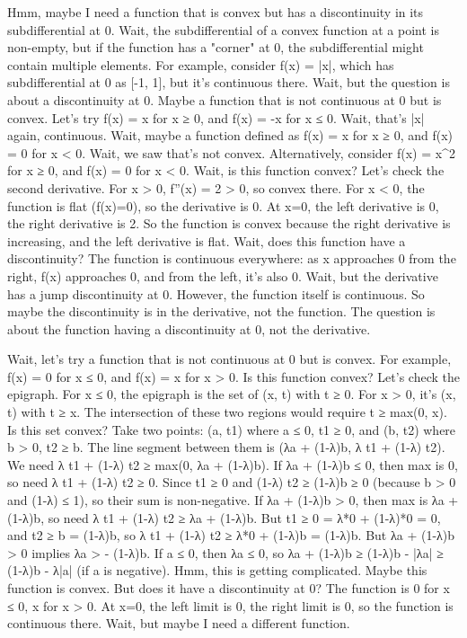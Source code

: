 Hmm, maybe I need a function that is convex but has a discontinuity in its subdifferential at 0. Wait, the subdifferential of a convex function at a point is non-empty, but if the function has a "corner" at 0, the subdifferential might contain multiple elements. For example, consider f(x) = |x|, which has subdifferential at 0 as [-1, 1], but it's continuous there. Wait, but the question is about a discontinuity at 0. Maybe a function that is not continuous at 0 but is convex. Let's try f(x) = x for x ≥ 0, and f(x) = -x for x ≤ 0. Wait, that's |x| again, continuous. Wait, maybe a function defined as f(x) = x for x ≥ 0, and f(x) = 0 for x < 0. Wait, we saw that's not convex. Alternatively, consider f(x) = x^2 for x ≥ 0, and f(x) = 0 for x < 0. Wait, is this function convex? Let's check the second derivative. For x > 0, f''(x) = 2 > 0, so convex there. For x < 0, the function is flat (f(x)=0), so the derivative is 0. At x=0, the left derivative is 0, the right derivative is 2. So the function is convex because the right derivative is increasing, and the left derivative is flat. Wait, does this function have a discontinuity? The function is continuous everywhere: as x approaches 0 from the right, f(x) approaches 0, and from the left, it's also 0. Wait, but the derivative has a jump discontinuity at 0. However, the function itself is continuous. So maybe the discontinuity is in the derivative, not the function. The question is about the function having a discontinuity at 0, not the derivative.

Wait, let's try a function that is not continuous at 0 but is convex. For example, f(x) = 0 for x ≤ 0, and f(x) = x for x > 0. Is this function convex? Let's check the epigraph. For x ≤ 0, the epigraph is the set of (x, t) with t ≥ 0. For x > 0, it's (x, t) with t ≥ x. The intersection of these two regions would require t ≥ max(0, x). Is this set convex? Take two points: (a, t1) where a ≤ 0, t1 ≥ 0, and (b, t2) where b > 0, t2 ≥ b. The line segment between them is (λa + (1-λ)b, λ t1 + (1-λ) t2). We need λ t1 + (1-λ) t2 ≥ max(0, λa + (1-λ)b). If λa + (1-λ)b ≤ 0, then max is 0, so need λ t1 + (1-λ) t2 ≥ 0. Since t1 ≥ 0 and (1-λ) t2 ≥ (1-λ)b ≥ 0 (because b > 0 and (1-λ) ≤ 1), so their sum is non-negative. If λa + (1-λ)b > 0, then max is λa + (1-λ)b, so need λ t1 + (1-λ) t2 ≥ λa + (1-λ)b. But t1 ≥ 0 = λ*0 + (1-λ)*0 = 0, and t2 ≥ b = (1-λ)b, so λ t1 + (1-λ) t2 ≥ λ*0 + (1-λ)b = (1-λ)b. But λa + (1-λ)b > 0 implies λa > - (1-λ)b. If a ≤ 0, then λa ≤ 0, so λa + (1-λ)b ≥ (1-λ)b - |λa| ≥ (1-λ)b - λ|a| (if a is negative). Hmm, this is getting complicated. Maybe this function is convex. But does it have a discontinuity at 0? The function is 0 for x ≤ 0, x for x > 0. At x=0, the left limit is 0, the right limit is 0, so the function is continuous there. Wait, but maybe I need a different function.

